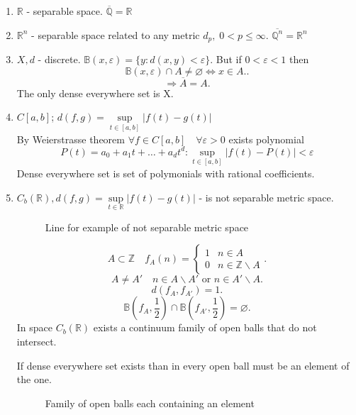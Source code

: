\begin{example}
    \begin{enumerate}
        \item $\mathbb{R}$ - separable space. $\overline{\mathbb{Q}} = \mathbb{R}$
        \item $\mathbb{R}^{n} $ - separable space related to any metric $d_{p}, \; 0 < p \leq \infty$. $\overline{\mathbb{Q}^{n}} = \mathbb{R}^{n}$
        \item $X, d$ - discrete. $\mathbb{B}(x, \varepsilon) = \{ y : d(x, y) < \varepsilon \} $. But if $0 < \varepsilon < 1$ then
            \[
            \mathbb{B}(x, \varepsilon) \cap A \not= \varnothing \iff x \in A.
            .\] 
            \[
             \Rightarrow \overline{A} = A
            .\] 
        The only dense everywhere set is X.
    \item $C[a, b]$; $d(f, g) = \underset{t \in [a, b]}{\sup} \left| f(t) - g(t) \right| $ \\
        By Weierstrasse theorem $\forall f \in C[a, b] \quad \forall \varepsilon > 0$ exists polynomial
    \[ P(t) = a_0 + a_1 t + \ldots + a_d t^{d} : \underset{t \in [a, b]}{\sup}
    \left| f(t) - P(t) \right| < \varepsilon \]
    Dense everywhere set is set of polymonials with rational coefficients.

    \item $C_{b}(\mathbb{R}), d(f, g) = \underset{t \in \mathbb{R}}{\sup} \left| f(t) - g(t) \right| $ - is not separable metric space.

\begin{figure}[ht]
    \centering
    \caption{Line for example of not separable metric space}
    \label{fig:line-for-example-of-not-separable-metric-space}
\end{figure}

\[ A \subset \mathbb{Z} \quad f_{A}(n) =
 \begin{cases}
     1 & n \in A \\
     0 & n \in \mathbb{Z} \backslash A
 \end{cases}
.\] 
\[
A \not= A' \quad n \in A \backslash A' \text{ or } n \in A' \backslash A
.\] 
\[
d(f_{A}, f_{A'}) = 1
.\] 
\[
\mathbb{B}(f_{A}, \frac{1}{2}) \cap \mathbb{B}(f_{A'}, \frac{1}{2}) = \varnothing
.\] 
In space $C_b(\mathbb{R})$ exists a continuum family of open balls that do not intersect.

If dense everywhere set exists than in every open ball must be an element of the one.
\begin{figure}[ht]
    \centering
    \caption{Family of open balls each containing an element}
    \label{fig:family-of-open-balls-each-containing-an-element}
\end{figure}
    \end{enumerate}
\end{example}
